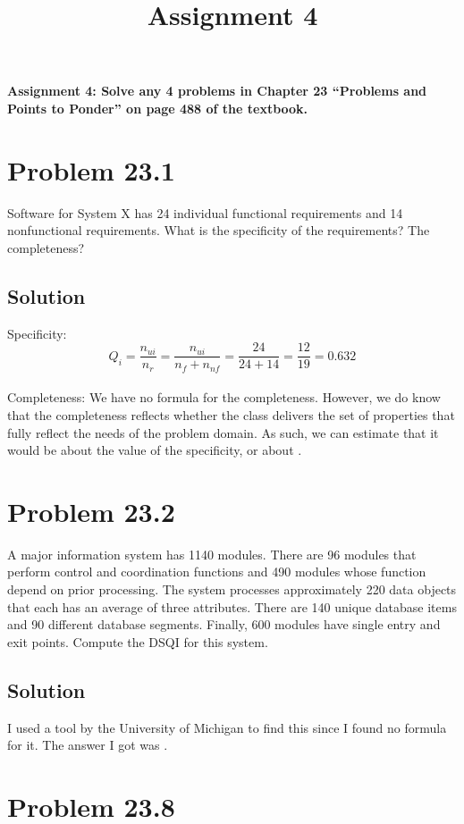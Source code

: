 \documentclass[10pt]{article}
\begin{document}
\title{Assignment 4}

\maketitle

\textbf{Assignment 4: Solve any 4 problems in Chapter 23 ``Problems and Points to Ponder'' on page 488 of the textbook.}
\section*{Problem 23.1} 
Software for System X has 24 individual functional requirements and 14 nonfunctional requirements. What is the specificity of the requirements? The completeness?
\subsection*{Solution}
Specificity: 
\begin{equation}
    Q_i =   \frac{n_{ui}}{n_r}
        =   \frac{n_{ui}}{n_f + n_{nf}}
        =   \frac{24}{24 + 14}
        =   \frac{12}{19}
        =   \boxed{0.632}
\end{equation}
\\
Completeness: We have no formula for the completeness. 
However, we do know that the completeness reflects whether the class delivers the set of properties that fully reflect the needs of the problem domain. 
As such, we can estimate that it would be about the value of the specificity, or about .


\section*{Problem 23.2} 
A major information system has 1140 modules. There are 96 modules that perform control and coordination functions and 490 modules whose function depend on prior processing. The system processes approximately 220 data objects that each has an average of three attributes. There are 140 unique database items and 90 different database segments. Finally, 600 modules have single entry and exit points. Compute the DSQI for this system.
\subsection*{Solution}
I used a tool by the University of Michigan to find this since I found no formula for it. 
The answer I got was .

\section*{Problem 23.8}
\end{document}
